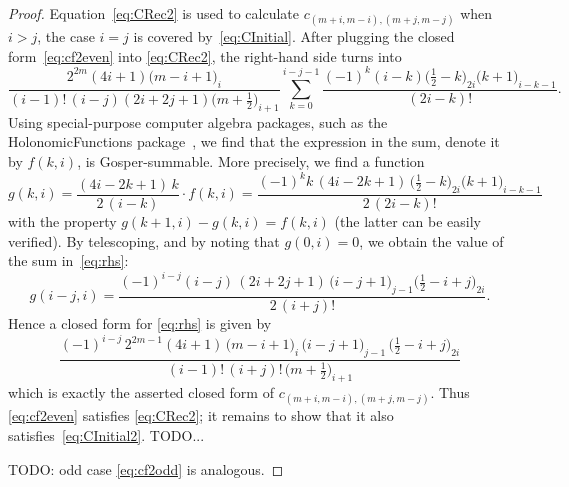 \documentclass[10pt,oneside,american]{amsart}
\numberwithin{equation}{section}
\numberwithin{figure}{section}
\theoremstyle{definition}
\theoremstyle{remark}
\theoremstyle{plain}
\theoremstyle{definition}
\theoremstyle{plain}
\theoremstyle{plain}
\theoremstyle{plain}
\begin{document}
\begin{proof}
  Equation~\eqref{eq:CRec2} is used to calculate $c_{(m+i,m-i),(m+j,m-j)}$
  when $i>j$, the case $i=j$ is covered by~\eqref{eq:CInitial}. After
  plugging the closed form~\eqref{eq:cf2even} into \eqref{eq:CRec2}, the
  right-hand side turns into
  \begin{equation}\label{eq:rhs}
    \frac{2^{2m} (4i+1) \bigl(m-i+1\bigr)_{\!i}}{(i-1)! \, (i-j) (2i+2j+1) \bigl(m+\frac12\bigr)_{\!i+1}}
    \sum_{k=0}^{i-j-1} \frac{(-1)^k (i-k) \bigl(\frac12-k\bigr)_{\!2i} \bigl(k+1\bigr)_{\!i-k-1}}{(2i-k)!}.
  \end{equation}
  Using special-purpose computer algebra packages, such as the
  HolonomicFunctions package~\cite{HolonomicFunctions}, we find that the
  expression in the sum, denote it by $f(k,i)$, is Gosper-summable. More
  precisely, we find a function
  \[
    g(k,i) = \frac{(4i-2k+1) \, k}{2 \, (i-k)} \cdot f(k,i) =
    \frac{(-1)^k k \, (4i-2k+1) \, \bigl(\frac12-k\bigr)_{\!2i} \bigl(k+1\bigr)_{\!i-k-1}}{2 \, (2i-k)!}
  \]
  with the property $g(k+1,i)-g(k,i)=f(k,i)$ (the latter can be easily
  verified). By telescoping, and by noting that $g(0,i)=0$, we obtain
  the value of the sum in~\eqref{eq:rhs}:
  \[
    g(i-j,i) = \frac{(-1)^{i-j} (i-j) \, (2i+2j+1) \, \bigl(i-j+1\bigr)_{\!j-1}
      \bigl(\frac12-i+j\bigr)_{\!2i}}{2 \, (i+j)!}.
  \]
  Hence a closed form for \eqref{eq:rhs} is given by
  \[
    \frac{(-1)^{i-j} \, 2^{2m-1} (4i+1) \, \bigl(m-i+1\bigr)_{\!i} \, \bigl(i-j+1\bigr)_{\!j-1}
      \, \bigl(\frac12-i+j\bigr)_{\!2i}}{(i-1)! \, (i+j)! \, \bigl(m+\frac12\bigr)_{\!i+1}}
  \]
  which is exactly the asserted closed form of $c_{(m+i,m-i),(m+j,m-j)}$.
  Thus \eqref{eq:cf2even} satisfies \eqref{eq:CRec2}; it remains to show that
  it also satisfies~\eqref{eq:CInitial2}. TODO...

  TODO: odd case \eqref{eq:cf2odd} is analogous.
\end{proof}
\end{document}
